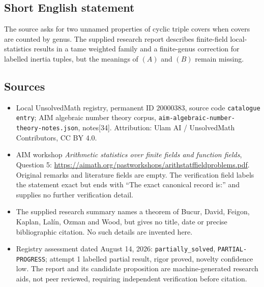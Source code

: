 \documentclass[11pt]{article}
\begin{document}
\subsection{Short English statement}
The source asks for two unnamed properties of cyclic triple covers when covers are counted by genus. The supplied research report describes finite-field local-statistics results in a tame weighted family and a finite-genus correction for labelled inertia tuples, but the meanings of \((A)\) and \((B)\) remain missing.
\subsection{Sources}
\begin{itemize}
\item Local UnsolvedMath registry, permanent ID \(20000383\), source code \texttt{catalogue entry}; AIM algebraic number theory corpus, \texttt{aim-algebraic-number-theory-notes.json}, notes[34]. Attribution: Ulam AI / UnsolvedMath Contributors, CC BY 4.0.
\item AIM workshop \emph{Arithmetic statistics over finite fields and function fields}, Question 5: \url{https://aimath.org/pastworkshops/arithstatffieldproblems.pdf}. Original remarks and literature fields are empty. The verification field labels the statement exact but ends with ``The exact canonical record is:'' and supplies no further verification detail.
\item The supplied research summary names a theorem of Bucur, David, Feigon, Kaplan, Lal\'in, Ozman and Wood, but gives no title, date or precise bibliographic citation. No such details are invented here.
\item Registry assessment dated August 14, 2026: \texttt{partially\_solved}, \texttt{PARTIAL-PROGRESS}; attempt 1 labelled partial result, rigor proved, novelty confidence low. The report and its candidate proposition are machine-generated research aids, not peer reviewed, requiring independent verification before citation.
\end{itemize}
\end{document}
